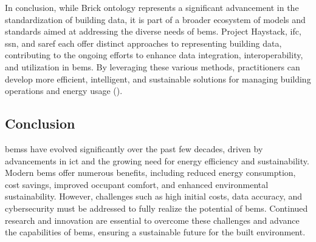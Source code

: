 In conclusion, while Brick ontology represents a significant advancement in the standardization of building data, it is part of a broader ecosystem of models and standards aimed at addressing the diverse needs of \gls{bems}.
Project Haystack, \gls{ifc}, \gls{ssn}, and \gls{saref} each offer distinct approaches to representing building data, contributing to the ongoing efforts to enhance data integration, interoperability, and utilization in \gls{bems}.
By leveraging these various methods, practitioners can develop more efficient, intelligent, and sustainable solutions for managing building operations and energy usage (\cite{Balaji2016,Balaji2018}).

\begin{table}[h!]
    \centering
    \caption{Comparison of Brick, \gls{saref}, Project Haystack, and \gls{ifc}}
\end{table}

\subsection*{Conclusion}
\glspl{bems} have evolved significantly over the past few decades, driven by advancements in \gls{ict} and the growing need for energy efficiency and sustainability.
Modern \gls{bems} offer numerous benefits, including reduced energy consumption, cost savings, improved occupant comfort, and enhanced environmental sustainability.
However, challenges such as high initial costs, data accuracy, and cybersecurity must be addressed to fully realize the potential of \gls{bems}.
Continued research and innovation are essential to overcome these challenges and advance the capabilities of \gls{bems}, ensuring a sustainable future for the built environment.